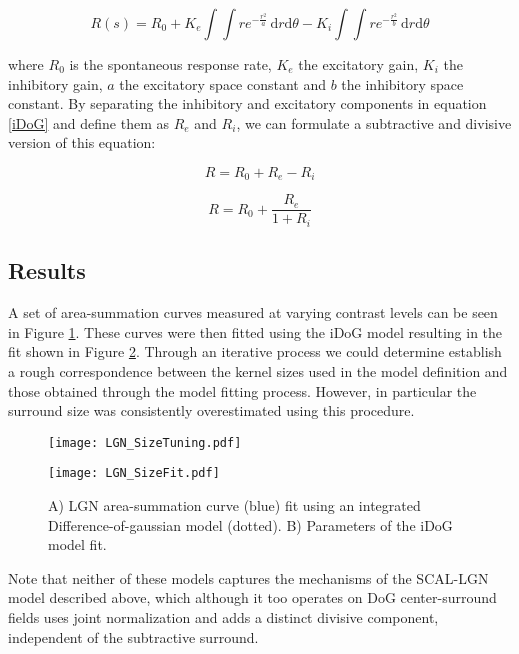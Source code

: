 \begin{equation}
R(s) = R_0 + K_e \int \int re^{-\frac{r^2}{a}} \,
\mathrm{d}r\mathrm{d}\theta - K_i \int\int re^{-\frac{r^2}{b}} \,
\mathrm{d}r\mathrm{d}\theta
\label{iDoG}
\end{equation}

\noindent where $R_0$ is the spontaneous response rate, $K_e$ the
excitatory gain, $K_i$ the inhibitory gain, $a$ the excitatory space
constant and $b$ the inhibitory space constant. By separating the
inhibitory and excitatory components in equation \ref{iDoG} and define
them as $R_e$ and $R_i$, we can formulate a subtractive and divisive
version of this equation:

\begin{equation}
R = R_0 + R_e - R_i
\label{DoGSubstractive}
\end{equation}

\begin{equation}
R = R_0 + \frac{R_e}{1+R_i}
\label{DoGDivisive}
\end{equation}

\subsection{Results}
 
A set of area-summation curves measured at varying contrast levels can
be seen in Figure \ref{LGNSizeTuning}. These curves were then fitted
using the iDoG model resulting in the fit shown in Figure
\ref{LGNSizeFit}. Through an iterative process we could determine
establish a rough correspondence between the kernel sizes used in the
model definition and those obtained through the model fitting
process. However, in particular the surround size was consistently
overestimated using this procedure.

\begin{figure}
	\centering
        \texttt{[image: LGN\_SizeTuning.pdf]}
	\caption{}
	\label{LGNSizeTuning}
\end{figure}

\begin{figure}
	\centering
        \texttt{[image: LGN\_SizeFit.pdf]}
	\caption{A) LGN area-summation curve (blue) fit using an
          integrated Difference-of-gaussian model (dotted). B)
          Parameters of the iDoG model fit.}
	\label{LGNSizeFit}
\end{figure}

Note that neither of these models captures the mechanisms of the
SCAL-LGN model described above, which although it too operates on DoG
center-surround fields uses joint normalization and adds a distinct
divisive component, independent of the subtractive surround.

